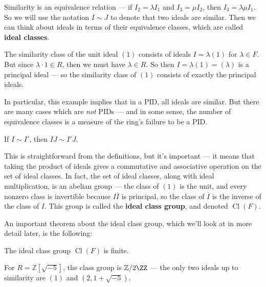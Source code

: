 Similarity is an equivalence relation --- if $I_2 = \lambda I_1$ and $I_3 = \mu I_2$, then $I_3 = \lambda \mu I_1$. So we will use the notation $I \sim J$ to denote that two ideals are similar. Then we can think about ideals in terms of their equivalence classes, which are called \textbf{ideal classes}. 

\begin{example}
    The similarity class of the unit ideal $(1)$ consists of ideals $I = \lambda(1)$ for $\lambda \in F$. But since $\lambda \cdot 1 \in R$, then we must have $\lambda \in R$. So then $I = \lambda(1) = (\lambda)$ is a principal ideal --- so the similarity class of $(1)$ consists of exactly the principal ideals. 
\end{example}

In particular, this example implies that in a PID, all ideals are similar. But there are many cases which are \emph{not} PIDs --- and in some sense, the number of equivalence classes is a measure of the ring's failure to be a PID. 

\begin{proposition}
If $I \sim I'$, then $IJ \sim I'J$. 
\end{proposition}

This is straightforward from the definitions, but it's important --- it means that taking the product of ideals gives a commutative and associative operation on the set of ideal classes. In fact, the set of ideal classes, along with ideal multiplication, is an abelian group --- the class of $(1)$ is the unit, and every nonzero class is invertible because $I\overline{I}$ is principal, so the class of $\overline{I}$ is the inverse of the class of $I$. This group is called the \textbf{ideal class group}, and denoted $\operatorname{Cl}(F)$. 

An important theorem about the ideal class group, which we'll look at in more detail later, is the following:

\begin{theorem}
    The ideal class group $\operatorname{Cl}(F)$ is finite. 
\end{theorem}

\begin{example}
    For $R = \mathbb{Z}[\sqrt{-5}]$, the class group is $\mathbb{Z}/2\ZZ$ --- the only two ideals up to similarity are $(1)$ and $(2, 1 + \sqrt{-5})$. 
\end{example}


